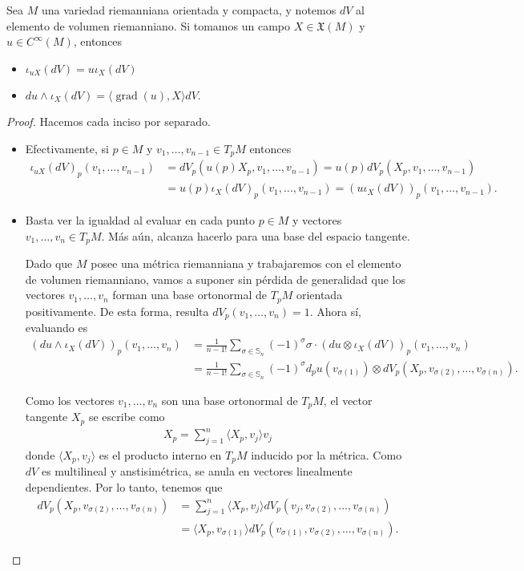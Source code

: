 \documentclass[11pt]{article}
\newcommand{\Ss}{\mathbb{S}}
\newcommand{\X}{\mathfrak{X}}
\newcommand{\grad}{\operatorname{grad}}
\newcommand{\ip}[1]{\langle #1 \rangle}
\newcommand{\paint}[1]{\color{color}{#1}}
\newenvironment{lemma}[2][Lema]{\begin{trivlist}
\item[\hskip \labelsep \paint{{\bfseries #1}}\hskip \labelsep {\bfseries #2.}]}{\end{trivlist}}
\begin{document}
\begin{lemma}{1} Sea $M$ una variedad riemanniana orientada y compacta, y notemos $dV$ al elemento de volumen riemanniano. Si tomamos un campo $X \in \X(M)$ y $u \in C^\infty(M)$, entonces
\begin{itemize}[listparindent = \parindent]
\item[i)] $\iota_{uX}(dV) = u\iota_X(dV)$
\item[ii)] $du \wedge \iota_X(dV) = \ip{\grad(u), X}dV$.
\end{itemize}
\end{lemma}
\begin{proof} Hacemos cada inciso por separado.
\begin{itemize}[listparindent = \parindent]
\item[i)] Efectivamente, si $p \in M$ y $v_1, \dots, v_{n-1} \in T_pM$ entonces
\begin{align*}
\iota_{uX}(dV)_p(v_1, \dots, v_{n-1}) &= dV_p(u(p)X_p,v_1, \dots, v_{n-1}) = u(p)dV_p(X_p,v_1,\dots,v_{n-1})\\
&= u(p)\iota_X(dV)_p(v_1,\dots,v_{n-1}) = (u\iota_X(dV))_p(v_1, \dots, v_{n-1}).
\end{align*}
\item[ii)] Basta ver la igualdad al evaluar en cada punto $p\in M$ y vectores $v_1, \dots, v_{n} \in T_pM$. Más aún, alcanza hacerlo para una base del espacio tangente. 

Dado que $M$ posee una métrica riemanniana y trabajaremos con el elemento de volumen riemanniano, vamos a suponer sin pérdida de generalidad que los vectores $v_1, \dots, v_{n}$ forman una base ortonormal de $T_pM$ orientada positivamente. De esta forma, resulta $dV_p(v_1, \dots, v_n) = 1$. Ahora sí, evaluando es
\begin{align*}
(du \wedge \iota_X(dV))_p(v_1,\dots,v_n) &= \frac{1}{n-1!}\sum_{\sigma \in \Ss_{n}}(-1)^\sigma \sigma \cdot (du \otimes \iota_X(dV))_p(v_1, \dots, v_n)\\
&= \frac{1}{n-1!}\sum_{\sigma \in \Ss_{n}}(-1)^\sigma d_pu(v_{\sigma(1)}) \otimes dV_p(X_p,v_{\sigma(2)}, \dots, v_{\sigma(n)}).
\end{align*}

Como los vectores $v_1, \dots, v_n$ son una base ortonormal de $T_pM$, el vector tangente $X_p$ se escribe como
\begin{align*}
X_p = \sum_{j=1}^n \ip{X_p,v_j}v_j
\end{align*}
donde $\ip{X_p,v_j}$ es el producto interno en $T_pM$ inducido por la métrica. Como $dV$ es multilineal y anstisimétrica, se anula en vectores linealmente dependientes. Por lo tanto, tenemos que
\begin{align*}
dV_p(X_p,v_{\sigma(2)}, \dots, v_{\sigma(n)}) &= \sum_{j=1}^n \ip{X_p,v_j}dV_p(v_j,v_{\sigma(2)}, \dots, v_{\sigma(n)})\\
& = \ip{X_p,v_{\sigma(1)}}dV_p(v_{\sigma(1)},v_{\sigma(2)}, \dots, v_{\sigma(n)}).
\end{align*}


\end{itemize}
\end{proof}
\end{document}
